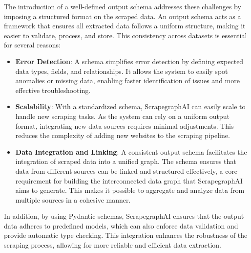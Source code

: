 The introduction of a well-defined output schema addresses these challenges by imposing a structured format on the scraped data. An output schema acts as a framework that ensures all extracted data follows a uniform structure, making it easier to validate, process, and store. This consistency across datasets is essential for several reasons:

\begin{itemize}
    \item \textbf{Error Detection}: A schema simplifies error detection by defining expected data types, fields, and relationships. It allows the system to easily spot anomalies or missing data, enabling faster identification of issues and more effective troubleshooting.
    \item \textbf{Scalability}: With a standardized schema, ScrapegraphAI can easily scale to handle new scraping tasks. As the system can rely on a uniform output format, integrating new data sources requires minimal adjustments. This reduces the complexity of adding new websites to the scraping pipeline.
    \item \textbf{Data Integration and Linking}: A consistent output schema facilitates the integration of scraped data into a unified graph. The schema ensures that data from different sources can be linked and structured effectively, a core requirement for building the interconnected data graph that ScrapegraphAI aims to generate. This makes it possible to aggregate and analyze data from multiple sources in a cohesive manner.
\end{itemize}

In addition, by using Pydantic schemas, ScrapegraphAI ensures that the output data adheres to predefined models, which can also enforce data validation and provide automatic type checking. This integration enhances the robustness of the scraping process, allowing for more reliable and efficient data extraction.

